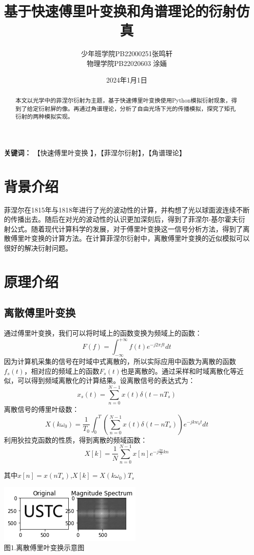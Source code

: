 \documentclass[a4paper,12pt]{article}
\title{\bfseries 基于快速傅里叶变换和角谱理论的衍射仿真}
\author{\normalsize 少年班学院\quad PB22000251\quad 张鸣轩 \\ \normalsize 物理学院\quad PB22020603 \quad 涂婳}
\date{\small 2024年1月1日}
\begin{document}
	\maketitle
	\begin{abstract}
		 	本文以光学中的菲涅尔衍射为主题，基于快速傅里叶变换使用Python模拟衍射现象，得到了给定衍射屏的像。再通过角谱理论，分析了自由光场下光的传播模拟，探究了矩孔衍射的两种模拟实现。
	\end{abstract}
	\begin{center}
		\textbf{\bfseries 关键词：} 【快速傅里叶变换 】，【菲涅尔衍射】，【角谱理论】
	\end{center}
	
	\tableofcontents
	\newpage
	\section{背景介绍}
	
		菲涅尔在1815年与1818年进行了光的波动性的计算，并构想了光以球面波连续不断的传播出去。随后在对光的波动性的认识更加深刻后，得到了菲涅尔-基尔霍夫衍射公式。随着现代计算科学的发展，对于傅里叶变换这一信号分析方法，得到了离散傅里叶变换的计算方法。在计算菲涅尔衍射中，离散傅里叶变换的近似模拟可以很好的解决衍射问题。
	\section{原理介绍}
	\subsection{离散傅里叶变换}
	通过傅里叶变换，我们可以将时域上的函数变换为频域上的函数：
	$$F(f)=\int_{-\infty}^{+\infty}f(t)e^{-j2\pi ft}dt$$
	因为计算机采集的信号在时域中式离散的，所以实际应用中函数为离散的函数$f_s(t)$，相对应的频域上的函数$F_s(t)$也是离散的。通过采样和时域离散化等近似，可以得到频域离散化的计算结果。设离散信号的表达式为：
	$$x_s(t)=\sum_{n=0}^{N-1}x(t)\delta(t-nT_s)$$
	离散信号的傅里叶级数：
	$$X(k\omega_{0})=\frac{1}{T_{0}}\int_{0}^{T}(\sum_{n=0}^{N-1}x(t)\delta(t-nT_{s}))e^{-jkw_{0}t}dt$$
	利用狄拉克函数的性质，得到离散的频域函数：
	$$X[k]=\frac1N\sum_{n=0}^{N-1}x[n]e^{-j\frac{2\pi}Nkn}$$	
	\begin{center}其中$x[n]=x(nT_s)$,$X[k]=X(k\omega_0)T_s$\end{center}
		\begin{center}
	\includegraphics[scale=0.75]{Pic1.png}\\
	图1.离散傅里叶变换示意图
	\end{center}\vspace{0.2cm}
	
\end{document}

